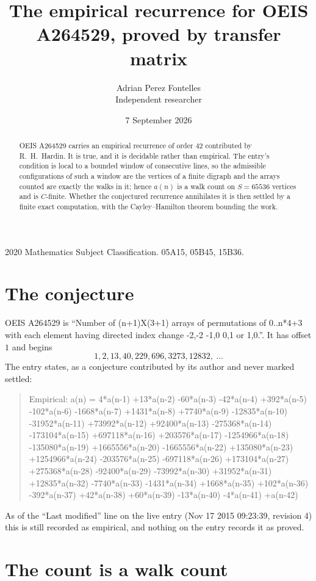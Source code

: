 \documentclass[11pt,a4paper]{article}
\title{The empirical recurrence for OEIS A264529, proved by transfer matrix}
\author{Adrian Perez Fontelles\\ \small Independent researcher}
\date{7 September 2026}
\theoremstyle{plain}
\theoremstyle{definition}
\begin{document}
\maketitle

\begin{abstract}
OEIS A264529 carries an empirical recurrence of order $42$ contributed by R.~H.~Hardin. It is
true, and it is decidable rather than empirical. The entry's condition is local to a bounded window of consecutive lines, so
the admissible configurations of such a window are the vertices of a finite digraph and the
arrays counted are exactly the walks in it; hence $a(n)$ is a walk count on $S=65536$ vertices
and is $C$-finite. Whether the conjectured recurrence annihilates it is then settled by a
finite exact computation, with the Cayley--Hamilton theorem bounding the work.
\end{abstract}

\noindent\small 2020 Mathematics Subject Classification. 05A15, 05B45, 15B36.\normalsize

\section{The conjecture}

OEIS A264529 is ``Number of (n+1)X(3+1) arrays of permutations of 0..n*4+3 with each element having directed index change -2,-2 -1,0 0,1 or 1,0.''. It has offset $1$ and begins
\[
1, 2, 13, 40, 229, 696, 3273, 12832,\ \dots
\]
The entry states, as a conjecture contributed by its author and never marked settled:
\begin{quote}
Empirical: a(n) = 4*a(n-1) +13*a(n-2) -60*a(n-3) -42*a(n-4) +392*a(n-5) -102*a(n-6) -1668*a(n-7) +1431*a(n-8) +7740*a(n-9) -12835*a(n-10) -31952*a(n-11) +73992*a(n-12) +92400*a(n-13) -275368*a(n-14) -173104*a(n-15) +697118*a(n-16) +203576*a(n-17) -1254966*a(n-18) -135080*a(n-19) +1665556*a(n-20) -1665556*a(n-22) +135080*a(n-23) +1254966*a(n-24) -203576*a(n-25) -697118*a(n-26) +173104*a(n-27) +275368*a(n-28) -92400*a(n-29) -73992*a(n-30) +31952*a(n-31) +12835*a(n-32) -7740*a(n-33) -1431*a(n-34) +1668*a(n-35) +102*a(n-36) -392*a(n-37) +42*a(n-38) +60*a(n-39) -13*a(n-40) -4*a(n-41) +a(n-42)
\end{quote}
As of the ``Last modified'' line on the live entry (Nov 17 2015 09:23:39, revision 4) this is still
recorded as empirical, and nothing on the entry records it as proved.

\section{The count is a walk count}
\end{document}
